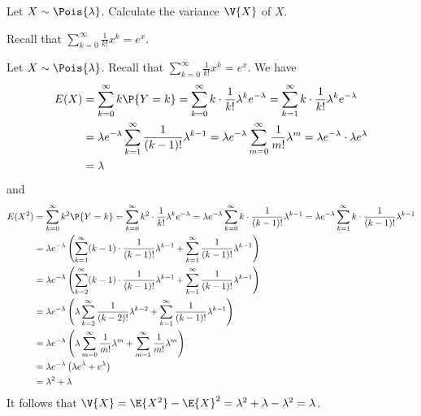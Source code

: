 \begin{exercise}
	Let $X \sim \Pois{\lambda}$. Calculate the variance $\V{X}$ of $X$.
	\begin{hint}
		Recall that $\sum_{k = 0}^{\infty} \frac{1}{k!} x^k = e^x$.
	\end{hint}
	\begin{solution}
		Let $X \sim \Pois{\lambda}$. Recall that $\sum_{k = 0}^{\infty} \frac{1}{k!} x^k = e^x$. We have
		\begin{align*}
			E(X) & = \sum_{k = 0}^{\infty} k \P{Y = k} = \sum_{k = 0}^{\infty} k \cdot \frac{1}{k!} \lambda^k e^{-\lambda} = \sum_{k = 1}^{\infty} k \cdot \frac{1}{k!} \lambda^k e^{-\lambda} \\
			& = \lambda e^{-\lambda} \sum_{k = 1}^{\infty} \frac{1}{(k - 1)!} \lambda^{k - 1} = \lambda e^{-\lambda} \sum_{m = 0}^{\infty} \frac{1}{m!} \lambda^m = \lambda e^{-\lambda} \cdot \lambda e^{\lambda} \\
			& = \lambda
		\end{align*}
		and
		\begin{align*}
			E(X^2) & = \sum_{k = 0}^{\infty} k^2 \P{Y = k} = \sum_{k = 0}^{\infty} k^2 \cdot \frac{1}{k!} \lambda^k e^{-\lambda} = \lambda e^{-\lambda} \sum_{k = 0}^{\infty} k \cdot \frac{1}{(k - 1)!} \lambda^{k - 1} = \lambda e^{-\lambda} \sum_{k = 1}^{\infty} k \cdot \frac{1}{(k - 1)!} \lambda^{k - 1} \\
			& = \lambda e^{-\lambda} \left(\sum_{k = 1}^{\infty} (k - 1) \cdot \frac{1}{(k - 1)!} \lambda^{k - 1} + \sum_{k = 1}^{\infty} \frac{1}{(k - 1)!} \lambda^{k - 1}\right) \\
			& = \lambda e^{-\lambda} \left(\sum_{k = 2}^{\infty} (k - 1) \cdot \frac{1}{(k - 1)!} \lambda^{k - 1} + \sum_{k = 1}^{\infty} \frac{1}{(k - 1)!} \lambda^{k - 1}\right) \\
			& = \lambda e^{-\lambda} \left(\lambda \sum_{k = 2}^{\infty} \frac{1}{(k - 2)!} \lambda^{k - 2} + \sum_{k = 1}^{\infty} \frac{1}{(k - 1)!} \lambda^{k - 1}\right) \\
			& = \lambda e^{-\lambda} \left(\lambda \sum_{m = 0}^{\infty} \frac{1}{m!} \lambda^m + \sum_{m = 1}^{\infty} \frac{1}{m!} \lambda^m\right) \\
			& = \lambda e^{-\lambda} \left(\lambda e^{\lambda} + e^{\lambda}\right) \\
			& = \lambda^2 + \lambda \\
		\end{align*}
		It follows that $\V{X} = \E{X^2} - \E{X}^2 = \lambda^2 + \lambda - \lambda^2 = \lambda$.
	\end{solution}
\end{exercise}

